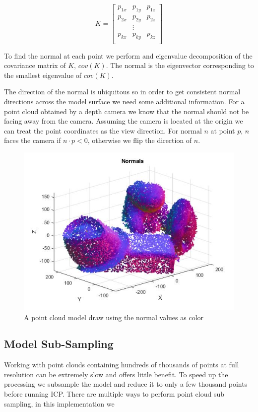 \documentclass[conference]{IEEEtran}
\begin{document}
\[
K =
\begin{bmatrix}
  p_{1x} & p_{1y} & p_{1z} \\
  p_{2x} & p_{2y} & p_{2z} \\
  &\vdots\\
  p_{kx} & p_{ky} & p_{kz} \\
\end{bmatrix}
\]

To find the normal at each point we perform and eigenvalue decomposition of the covariance matrix of $K$, $cov(K)$. The normal is the eigenvector corresponding to the smallest eigenvalue of $cov(K)$. 

The direction of the normal is ubiquitous so in order to get consistent normal directions across the model surface we need some additional information. For a point cloud obtained by a depth camera we know that the normal should not be facing away from the camera. Assuming the camera is located at the origin we can treat the point coordinates as the view direction. For normal $n$ at point $p$, $n$ faces the camera if $n \cdot p < 0$, otherwise we flip the direction of $n$. 

\begin{figure}
  \centering
    \includegraphics[width=\linewidth]{img/normals2}
    \caption{A point cloud model draw using the normal values as color}
    \label{fig:normals}
\end{figure}

\subsection{Model Sub-Sampling}
Working with point clouds containing hundreds of thousands of points at full resolution can be extremely slow and offers little benefit. To speed up the processing we subsample the model and reduce it to only a few thousand points before running ICP. There are multiple ways to perform point cloud sub sampling, in this implementation we 
\end{document}
